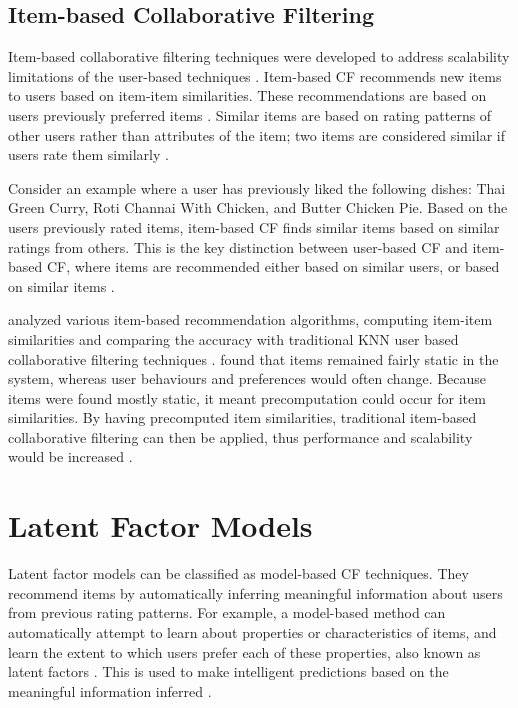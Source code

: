 \subsection{Item-based Collaborative Filtering}

Item-based collaborative filtering techniques were developed to address scalability limitations of the user-based techniques \cite{survey}. Item-based CF recommends new items to users based on item-item similarities. These recommendations are based on users previously preferred items \cite{mahoutaction}. Similar items are based on rating patterns of other users rather than attributes of the item; two items are considered similar if users rate them similarly \cite{schafer2007collaborative}.

Consider an example where a user has previously liked the following dishes: Thai Green Curry, Roti Channai With Chicken, and Butter Chicken Pie. Based on the users previously rated items, item-based CF finds similar items based on similar ratings from others. This is the key distinction between user-based CF and item-based CF, where items are recommended either based on similar users, or based on similar items \cite{mahoutaction}.    

\citeauthor{itembased} \cite{itembased} analyzed various item-based recommendation algorithms, computing item-item similarities and comparing the accuracy with traditional KNN user based collaborative filtering techniques \cite{itembased}. \citeauthor{itembased} found that items remained fairly static in the system, whereas user behaviours and preferences would often change. Because items were found mostly static, it meant precomputation could occur for item similarities. By having precomputed item similarities, traditional item-based collaborative filtering can then be applied, thus performance and scalability would be increased \cite{scalable}.
 
\section{Latent Factor Models}

Latent factor models can be classified as model-based CF techniques. They recommend items by automatically inferring meaningful information about users from previous rating patterns. For example, a model-based method can automatically attempt to learn about properties or characteristics of items, and learn the extent to which users prefer each of these properties, also known as latent factors \cite{koren2011}. This is used to make intelligent predictions based on the meaningful information inferred \cite{survey}. 

